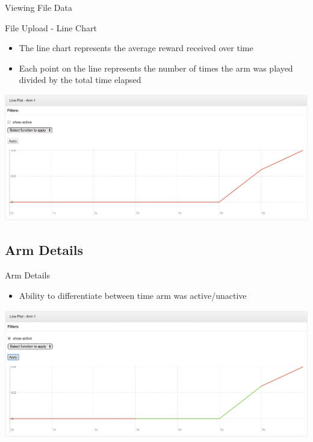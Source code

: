 \documentclass{beamer}
\begin{document}
\begin{frame}{Viewing File Data}
\begin{frame}{File Upload - Line Chart}
\begin{itemize}
\item The line chart represents the average reward received over time
\item Each point on the line represents the number of times the arm was played divided by the total time elapsed
\end{itemize}
\includegraphics[scale=0.25]{linechart.png}
\end{frame}

\subsection{Arm Details}
\begin{frame}{Arm Details}
\begin{itemize}
\item Ability to differentiate between time arm was active/unactive
\end{itemize}
\includegraphics[scale=0.25]{linechartactive.png}
\end{frame}


\end{frame}
\end{document}
